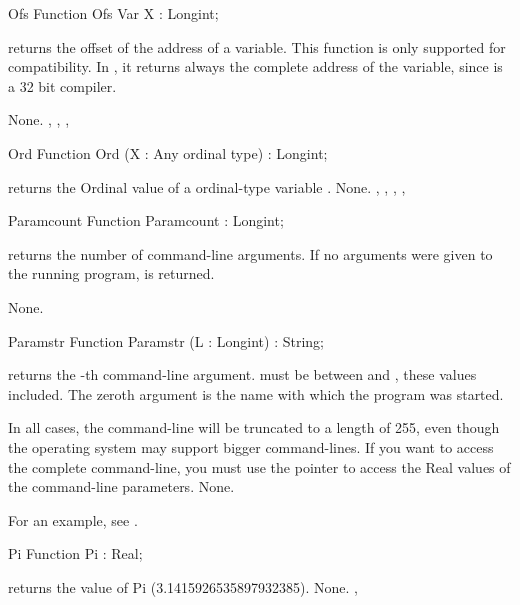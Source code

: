 \documentclass{report}
\begin{document}

\begin{function}{Ofs}
\Declaration
Function Ofs Var X : Longint;

\Description
{} returns the offset of the address of a variable.
This function is only supported for compatibility. In \fpc, it
returns always the complete address of the variable, since \fpc is a 32 bit
compiler.

\Errors
None.
\SeeAlso
{}, , , 
\end{function}


\begin{function}{Ord}
\Declaration
Function Ord (X : Any ordinal type) : Longint;

\Description
{} returns the Ordinal value of a ordinal-type variable .
\Errors
None.
\SeeAlso
{}, , , , 
\end{function}


\begin{function}{Paramcount}
\Declaration
Function Paramcount  : Longint;

\Description
{} returns the number of command-line arguments. If no
arguments were given to the running program,  is returned.

\Errors
None.
\SeeAlso
{}
\end{function}


\begin{function}{Paramstr}
\Declaration
Function Paramstr (L : Longint) : String;

\Description
{} returns the -th command-line argument.  must
be between  and , these values included.
The zeroth argument is the name with which the program was started.

In all cases, the command-line will be truncated to a length of 255,
even though the operating system may support bigger command-lines. If you
want to access the complete command-line, you must use the  pointer
to access the Real values of the command-line parameters.
\Errors
None.
\SeeAlso
{}
\end{function}
For an example, see .
\begin{function}{Pi}
\Declaration
Function Pi  : Real;

\Description
{} returns the value of Pi (3.1415926535897932385).
\Errors
None.
\SeeAlso
{}, 
\end{function}
\end{document}
